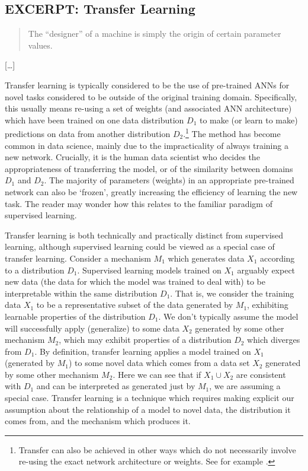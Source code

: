 \documentclass[11pt, oneside]{article}   	%
\begin{document}
\subsection{EXCERPT: Transfer Learning}

\begin{quote}
The ``designer'' of a machine is simply the origin of certain parameter values.  \cite[p. 4448]{AshbyJournal}
\end{quote}

[\dots]

Transfer learning is typically considered to be the use of pre-trained ANNs for novel tasks considered to be outside of the original training domain.  Specifically, this usually means re-using a set of weights (and associated ANN architecture) which have been trained on one data distribution $D_1$ to make (or learn to make) predictions on data from another distribution $D_2$.\footnote{Transfer can also be achieved in other ways which do not necessarily involve re-using the exact network architecture or weights.  See for example \citet{Pratt1991}.}  The method has become common in data science, mainly due to the impracticality of always training a new network.  Crucially, it is the human data scientist who decides the appropriateness of transferring the model, or of the similarity between domains $D_1$ and $D_2$.  The majority of parameters (weights) in an appropriate pre-trained network can also be `frozen', greatly increasing the efficiency of learning the new task.  The reader may wonder how this relates to the familiar paradigm of supervised learning.  

Transfer learning is both technically and practically distinct from supervised learning, although supervised learning could be viewed as a special case of transfer learning.  Consider a mechanism $M_1$ which generates data $X_1$ according to a distribution $D_1$.  Supervised learning models trained on $X_1$ arguably expect new data (the data for which the model was trained to deal with) to be interpretable within the same distribution $D_1$.  That is, we consider the training data $X_1$ to be a representative subset of the data generated by $M_1$, exhibiting learnable properties of the distribution $D_1$.  We don't typically assume the model will successfully apply (generalize) to some data $X_2$ generated by some other mechanism $M_2$, which may exhibit properties of a distribution $D_2$ which diverges from $D_1$.  By definition, transfer learning applies a model trained on $X_1$ (generated by $M_1$) to some novel data which comes from a data set $X_2$ generated by some other mechanism $M_2$.  Here we can see that if $X_1 \cup X_2$ are consistent with $D_1$ and can be interpreted as  generated just by $M_1$, we are assuming a special case.  Transfer learning is a technique which requires making explicit our assumption about the relationship of a model to novel data, the distribution it comes from, and the mechanism which produces it.
\end{document}
